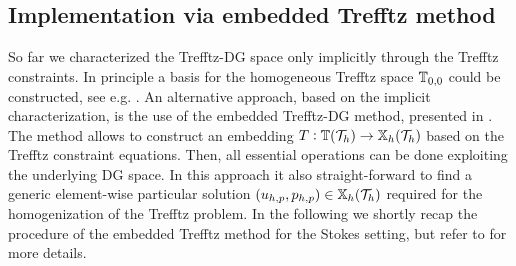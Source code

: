 \documentclass[sn-mathphys,Numbered]{sn-jnl}%
\theoremstyle{remark}%
\theoremstyle{definition}%
\begin{document}




\subsection{Implementation via embedded Trefftz method}\label{sec:impl}
So far we characterized the Trefftz-DG space only implicitly through the Trefftz
constraints. In principle a basis for the homogeneous Trefftz space $\mathbb{T}_{0,0}$ could be
constructed, see e.g. \cite{POITOU2000561,Bouberbachene}. %
An alternative approach, based on the implicit characterization, is the use of the embedded Trefftz-DG method,
presented in \cite{2201.07041}.
The method allows to construct an embedding $T:
\mathbb{T}({\mathcal{T}_h}) \to \mathbb{X}_h({\mathcal{T}_h})$ based on the Trefftz constraint equations. Then, all
essential operations can be done exploiting the underlying DG space. In this
approach it also straight-forward to find a generic element-wise particular
solution $(u_{h,p},p_{h,p})\in \mathbb{X}_h({\mathcal{T}_h})$ required for the homogenization of the
Trefftz problem. In the following we shortly recap the procedure of the embedded Trefftz method for the Stokes
setting, but refer to \cite{2201.07041} for more details. 
\end{document}
